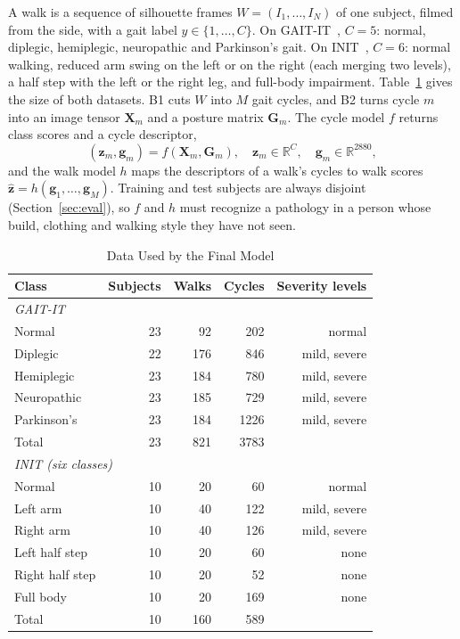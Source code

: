 \documentclass[conference]{IEEEtran}
\begin{document}
A walk is a sequence of silhouette frames $W=(I_1,\dots,I_N)$ of one subject, filmed from the side, with a gait label $y\in\{1,\dots,C\}$. On GAIT-IT~\cite{gaitit}, $C=5$: normal, diplegic, hemiplegic, neuropathic and Parkinson's gait. On INIT~\cite{init}, $C=6$: normal walking, reduced arm swing on the left or on the right (each merging two levels), a half step with the left or the right leg, and full-body impairment. Table~\ref{tab:data} gives the size of both datasets. B1 cuts $W$ into $M$ gait cycles, and B2 turns cycle $m$ into an image tensor $\mathbf{X}_m$ and a posture matrix $\mathbf{G}_m$. The cycle model $f$ returns class scores and a cycle descriptor,
\begin{equation}
(\mathbf{z}_m,\mathbf{g}_m)=f(\mathbf{X}_m,\mathbf{G}_m),\quad \mathbf{z}_m\in\mathbb{R}^{C},\quad \mathbf{g}_m\in\mathbb{R}^{2880},
\label{eq:model}
\end{equation}
and the walk model $h$ maps the descriptors of a walk's cycles to walk scores $\hat{\mathbf{z}}=h(\mathbf{g}_1,\dots,\mathbf{g}_M)$. Training and test subjects are always disjoint (Section~\ref{sec:eval}), so $f$ and $h$ must recognize a pathology in a person whose build, clothing and walking style they have not seen.

\begin{table}[t]
\centering
\caption{Data Used by the Final Model}
\label{tab:data}
\begin{tabular}{lrrrr}
\toprule
Class & Subjects & Walks & Cycles & Severity levels \\
\midrule
\multicolumn{5}{l}{\textit{GAIT-IT}} \\
Normal & 23 & 92 & 202 & normal \\
Diplegic & 22 & 176 & 846 & mild, severe \\
Hemiplegic & 23 & 184 & 780 & mild, severe \\
Neuropathic & 23 & 185 & 729 & mild, severe \\
Parkinson's & 23 & 184 & 1226 & mild, severe \\
Total & 23 & 821 & 3783 & \\
\midrule
\multicolumn{5}{l}{\textit{INIT (six classes)}} \\
Normal & 10 & 20 & 60 & normal \\
Left arm & 10 & 40 & 122 & mild, severe \\
Right arm & 10 & 40 & 126 & mild, severe \\
Left half step & 10 & 20 & 60 & none \\
Right half step & 10 & 20 & 52 & none \\
Full body & 10 & 20 & 169 & none \\
Total & 10 & 160 & 589 & \\
\bottomrule
\end{tabular}
\end{table}
\end{document}
